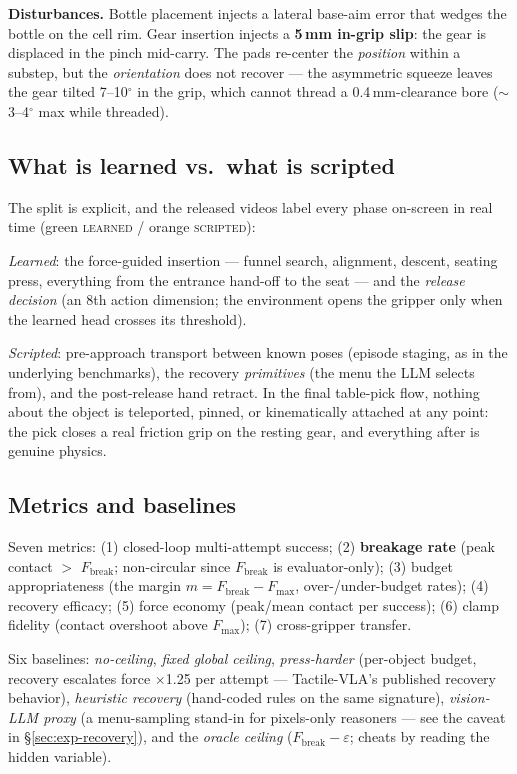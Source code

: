\documentclass[11pt]{article}
\newcommand{\Fmax}{\ensuremath{F_{\max}}}
\newcommand{\Fbreak}{\ensuremath{F_{\mathrm{break}}}}
\begin{document}
\textbf{Disturbances.} Bottle placement injects a lateral base-aim error that wedges the bottle on the cell rim. Gear insertion injects a \textbf{5\,mm in-grip slip}: the gear is displaced in the pinch mid-carry. The pads re-center the \emph{position} within a substep, but the \emph{orientation} does not recover --- the asymmetric squeeze leaves the gear tilted 7--10$^\circ$ in the grip, which cannot thread a 0.4\,mm-clearance bore ($\sim$3--4$^\circ$ max while threaded).

\subsection{What is learned vs.\ what is scripted}
\label{sec:learned-scripted}

The split is explicit, and the released videos label every phase on-screen in real time (green \textsc{learned} / orange \textsc{scripted}):

\emph{Learned}: the force-guided insertion --- funnel search, alignment, descent, seating press, everything from the entrance hand-off to the seat --- and the \emph{release decision} (an 8th action dimension; the environment opens the gripper only when the learned head crosses its threshold).

\emph{Scripted}: pre-approach transport between known poses (episode staging, as in the underlying benchmarks), the recovery \emph{primitives} (the menu the LLM selects from), and the post-release hand retract. In the final table-pick flow, nothing about the object is teleported, pinned, or kinematically attached at any point: the pick closes a real friction grip on the resting gear, and everything after is genuine physics.

\subsection{Metrics and baselines}

Seven metrics: (1) closed-loop multi-attempt success; (2) \textbf{breakage rate} (peak contact $>$ \Fbreak{}; non-circular since \Fbreak{} is evaluator-only); (3) budget appropriateness (the margin $m=\Fbreak-\Fmax$, over-/under-budget rates); (4) recovery efficacy; (5) force economy (peak/mean contact per success); (6) clamp fidelity (contact overshoot above \Fmax); (7) cross-gripper transfer.

Six baselines: \emph{no-ceiling}, \emph{fixed global ceiling}, \emph{press-harder} (per-object budget, recovery escalates force $\times$1.25 per attempt --- Tactile-VLA's published recovery behavior), \emph{heuristic recovery} (hand-coded rules on the same signature), \emph{vision-LLM proxy} (a menu-sampling stand-in for pixels-only reasoners --- see the caveat in \S\ref{sec:exp-recovery}), and the \emph{oracle ceiling} ($\Fbreak-\varepsilon$; cheats by reading the hidden variable).
\end{document}
